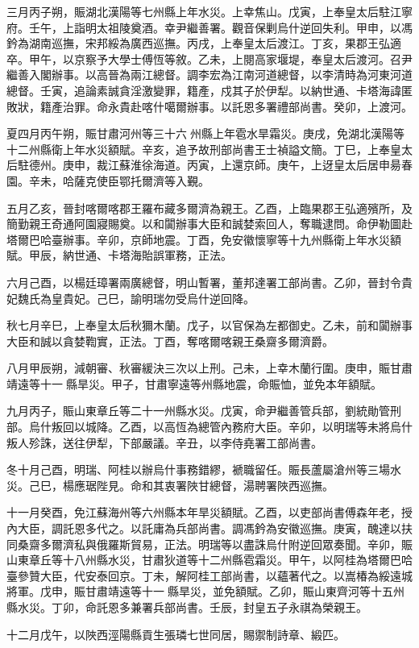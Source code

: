 \begin{pinyinscope}
三月丙子朔，賑湖北漢陽等七州縣上年水災。上幸焦山。戊寅，上奉皇太后駐江寧府。壬午，上詣明太祖陵奠酒。幸尹繼善署。觀音保剿烏什逆回失利。甲申，以馮鈐為湖南巡撫，宋邦綏為廣西巡撫。丙戌，上奉皇太后渡江。丁亥，果郡王弘適卒。甲午，以京察予大學士傅恆等敘。乙未，上閱高家堰堤，奉皇太后渡河。召尹繼善入閣辦事。以高晉為兩江總督。調李宏為江南河道總督，以李清時為河東河道總督。壬寅，追論素誠貪淫激變罪，籍產，戍其子於伊犁。以納世通、卡塔海諱匿敗狀，籍產治罪。命永貴赴喀什噶爾辦事。以託恩多署禮部尚書。癸卯，上渡河。

夏四月丙午朔，賑甘肅河州等三十六州縣上年雹水旱霜災。庚戌，免湖北漢陽等十二州縣衛上年水災額賦。辛亥，追予故刑部尚書王士禎謚文簡。丁巳，上奉皇太后駐德州。庚申，裁江蘇淮徐海道。丙寅，上還京師。庚午，上迓皇太后居申昜春園。辛未，哈薩克使臣鄂托爾濟等入覲。

五月乙亥，晉封喀爾喀郡王羅布藏多爾濟為親王。乙酉，上臨果郡王弘適殯所，及簡勤親王奇通阿園寢賜奠。以和闐辦事大臣和誠婪索回人，奪職逮問。命伊勒圖赴塔爾巴哈臺辦事。辛卯，京師地震。丁酉，免安徽懷寧等十九州縣衛上年水災額賦。甲辰，納世通、卡塔海貽誤軍務，正法。

六月己酉，以楊廷璋署兩廣總督，明山暫署，董邦達署工部尚書。乙卯，晉封令貴妃魏氏為皇貴妃。己巳，諭明瑞勿受烏什逆回降。

秋七月辛巳，上奉皇太后秋獮木蘭。戊子，以官保為左都御史。乙未，前和闐辦事大臣和誠以貪婪鞫實，正法。丁酉，奪喀爾喀親王桑齋多爾濟爵。

八月甲辰朔，減朝審、秋審緩決三次以上刑。己未，上幸木蘭行圍。庚申，賑甘肅靖遠等十一縣旱災。甲子，甘肅寧遠等州縣地震，命賑恤，並免本年額賦。

九月丙子，賑山東章丘等二十一州縣水災。戊寅，命尹繼善管兵部，劉統勛管刑部。烏什叛回以城降。乙酉，以高恆為總管內務府大臣。辛卯，以明瑞等未將烏什叛人殄誅，送往伊犁，下部嚴議。辛丑，以李侍堯署工部尚書。

冬十月己酉，明瑞、阿桂以辦烏什事務錯繆，褫職留任。賑長蘆屬滄州等三場水災。己巳，楊應琚陛見。命和其衷署陜甘總督，湯聘署陜西巡撫。

十一月癸酉，免江蘇海州等六州縣本年旱災額賦。乙酉，以吏部尚書傅森年老，授內大臣，調託恩多代之。以託庸為兵部尚書。調馮鈐為安徽巡撫。庚寅，醜達以扶同桑齋多爾濟私與俄羅斯貿易，正法。明瑞等以盡誅烏什附逆回眾奏聞。辛卯，賑山東章丘等十八州縣水災，甘肅狄道等十二州縣雹霜災。甲午，以阿桂為塔爾巴哈臺參贊大臣，代安泰回京。丁未，解阿桂工部尚書，以蘊著代之。以嵩椿為綏遠城將軍。戊申，賑甘肅靖遠等十一縣旱災，並免額賦。乙卯，賑山東齊河等十五州縣水災。丁卯，命託恩多兼署兵部尚書。壬辰，封皇五子永祺為榮親王。

十二月戊午，以陜西涇陽縣貢生張璘七世同居，賜禦制詩章、緞匹。


\end{pinyinscope}